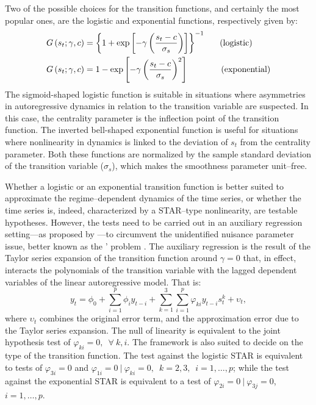 \documentclass[11pt]{article}
\begin{document}
Two of the possible choices for the transition functions, and certainly the most popular ones, are the logistic and exponential functions, respectively given by:
\begin{align}
\label{logistic}
G\left(s_t;\gamma,c\right) &= \left\{1 + \exp \left[ -\gamma \left(\frac{s_t - c}{\sigma_s}\right) \right] \right\}^{-1}\;~~\hspace{.1in}\text{(logistic)} \\
\label{exponential}
G\left(s_t;\gamma,c\right) &= 1 - \exp \left[ -\gamma \left(\frac{s_t - c}{\sigma_s}\right)^2 \right]\;~~\hspace{.4in}\text{(exponential)}
\end{align}
The sigmoid-shaped logistic function is suitable in situations where asymmetries in autoregressive dynamics in relation to the transition variable are suspected. In this case, the centrality parameter is the inflection point of the transition function. The inverted bell-shaped exponential function is useful for situations where nonlinearity in dynamics is linked to the deviation of $s_t$ from the centrality parameter. Both these functions are normalized by the sample standard deviation of the transition variable ($\sigma_{s}$), which makes the smoothness parameter unit--free.

Whether a logistic or an exponential transition function is better suited to approximate the regime--dependent dynamics of the time series, or whether the time series is, indeed, characterized by a STAR--type nonlinearity, are testable hypotheses. However, the tests need to be carried out in an auxiliary regression setting---as proposed by \cite{luukkonen1988}---to circumvent the unidentified nuisance parameter issue, better known as the \citeauthor{davies1977}' problem \citep{davies1977,davies1987}. The auxiliary regression is the result of the Taylor series expansion of the transition function around $\gamma=0$ that, in effect, interacts the polynomials of the transition variable with the lagged dependent variables of the linear autoregressive model. That is:
\begin{equation}
y_t = \phi_{0} + \sum_{i=1}^{p}{\phi_{i} y_{t-i}}  + \sum_{k=1}^{3}\sum_{i=1}^{p}{\varphi_{ki} y_{t-i}}s_t^k + \upsilon_t,
\label{aux}
\end{equation} 
where $\upsilon_t$ combines the original error term, and the approximation error due to the Taylor series expansion. The null of linearity is equivalent to the joint hypothesis test of $\varphi_{ki}=0,\;~\forall~k, i$. The framework is also suited to decide on the type of the transition function. The test against the logistic STAR is equivalent to tests of $\varphi_{3i}=0$ and $\varphi_{1i}=0~|~\varphi_{ki} = 0,\;~k=2,3,\;~i=1,\ldots,p$; while the test against the exponential STAR is equivalent to a test of $\varphi_{2i} = 0~|~\varphi_{3j} = 0$, $i=1,\ldots,p$.
\end{document}
